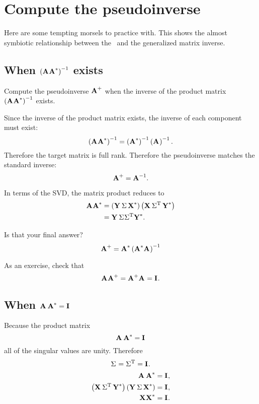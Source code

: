 \section{Compute the pseudoinverse}

Here are some tempting morsels to practice with. This shows the almost symbiotic relationship between the \svdl \ and the generalized matrix inverse.

\subsection{When $\paren{\A{}\A{*}}^{-1}$ exists}
Compute the pseudoinverse $\A{+}$ when the inverse of the product matrix $\paren{\A{}\A{*}}^{-1}$ exists.

Since the inverse of the product matrix exists, the inverse of each component must exist:
\begin{equation}
  \paren{\A{}\A{*}}^{-1} = \paren{\A{*}}^{-1}\paren{\A{}}^{-1}.
\end{equation}
Therefore the target matrix is full rank. Therefore the pseudoinverse matches the standard inverse: 
\begin{equation}
  \A{+} = \A{-1}.
\end{equation}

In terms of the SVD, the matrix product reduces to
\begin{equation}
  \begin{split}
    \A{}\A{*} & = \paren{\svd{*}}\paren{\svdt{*}}\\
      &= \Y{}\, \sig{}\sig{T}  \Y{*}.
  \end{split}
\end{equation}

Is that your final answer?
\begin{equation}
  \A{+} = \A{*}\paren{\prdm{*}}^{-1}
\end{equation}

As an exercise, check that
\begin{equation}
  \A{}\A{+} = \A{+}\A{} = \I{}.
\end{equation}

\subsection{When $\prdmm{*}=\I{}$}
Because the product matrix
\begin{equation}
  \prdmm{*} = \I{}
\end{equation}
all of the singular values are unity. Therefore
\begin{equation}
  \sig{}=\sig{T}=\I{}.
\end{equation}
\begin{equation}
  \begin{split}
    \prdmm{*}&=\I{},\\
    \paren{\svdt{*}}\paren{\svd{*}}&=\I{},\\
    \X{}\X{*}&=\I{}.
  \end{split}
\end{equation}

	
\endinput